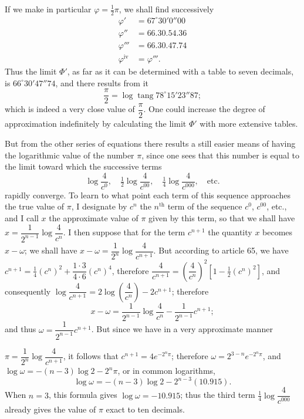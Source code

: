 \documentclass{article}
\begin{document}
If we make in particular $\varphi=\frac{1}{2}\pi$, we shall find successively
\[ \begin{aligned} \varphi'&=67^{\circ}30'0''00\\ \varphi''&=66.30.54.36\\ \varphi'''&=66.30.47.74\\ \varphi^{\text{iv}}&=\varphi'''. \end{aligned} \]
Thus the limit $\Phi'$, as far as it can be determined with a table to seven decimals, is $66^{\circ}30'47''74$, and there results from it
\[ \frac{\pi}{2}=\log\operatorname{tang}78^{\circ}15'23''87; \]
which is indeed a very close value of $\dfrac{\pi}{2}$. One could increase the degree of approximation indefinitely by calculating the limit $\Phi'$ with more extensive tables.

But from the other series of equations there results a still easier means of having the logarithmic value of the number $\pi$, since one sees that this number is equal to the limit toward which the successive terms
\[ \log\frac{4}{c^{0}},\quad \tfrac{1}{2}\log\frac{4}{c^{00}},\quad \tfrac{1}{4}\log\frac{4}{c^{000}},\quad \text{etc.} \]
rapidly converge. To learn to what point each term of this sequence approaches the true value of $\pi$, I designate by $c^{n}$ the $n^{\text{th}}$ term of the sequence $c^{0}$, $c^{00}$, etc., and I call $x$ the approximate value of $\pi$ given by this term, so that we shall have $x=\dfrac{1}{2^{n-1}}\log\dfrac{4}{c^{n}}$. I then suppose that for the term $c^{n+1}$ the quantity $x$ becomes $x-\omega$; we shall have $x-\omega=\dfrac{1}{2^{n}}\log\dfrac{4}{c^{n+1}}$. But according to article 65, we have $c^{n+1}=\frac{1}{4}(c^{n})^{2}+\dfrac{1\cdot3}{4\cdot6}(c^{n})^{4}$, therefore $\dfrac{4}{c^{n+1}}=\left(\dfrac{4}{c^{n}}\right)^{2}[1-\frac{1}{2}(c^{n})^{2}]$, and consequently $\log\dfrac{4}{c^{n+1}}=2\log\left(\dfrac{4}{c^{n}}\right)-2c^{n+1}$; therefore
\[ x-\omega=\frac{1}{2^{n-1}}\log\frac{4}{c^{n}}-\frac{1}{2^{n-1}}c^{n+1}; \]
and thus $\omega=\dfrac{1}{2^{n-1}}c^{n+1}$. But since we have in a very approximate manner

$\pi=\dfrac{1}{2^{n}}\log\dfrac{4}{c^{n+1}}$, it follows that $c^{n+1}=4e^{-2^{n}\pi}$; therefore $\omega=2^{3-n}e^{-2^{n}\pi}$, and $\log\omega=-(n-3)\log2-2^{n}\pi$, or in common logarithms,
\[ \log\omega=-(n-3)\log2-2^{n-3}(10.915). \]
When $n=3$, this formula gives $\log\omega=-10.915$; thus the third term $\frac{1}{4}\log\dfrac{4}{c^{000}}$ already gives the value of $\pi$ exact to ten decimals.
\end{document}
